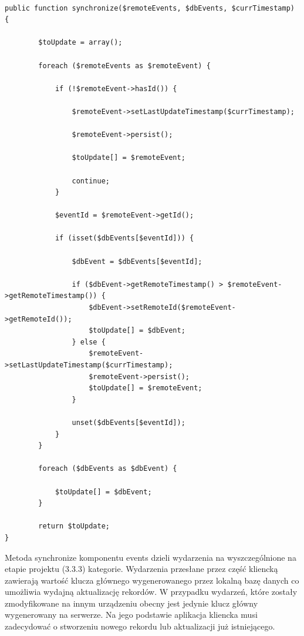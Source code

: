 \begin{lstlisting}[caption=Modyfikacja wydarzeń w metodzie synchronize komponentu Events., label=amb, captionpos=b]

public function synchronize($remoteEvents, $dbEvents, $currTimestamp) {

    	$toUpdate = array();

    	foreach ($remoteEvents as $remoteEvent) {

	        if (!$remoteEvent->hasId()) {

            	$remoteEvent->setLastUpdateTimestamp($currTimestamp);

            	$remoteEvent->persist();

            	$toUpdate[] = $remoteEvent;

            	continue;
        	}

        	$eventId = $remoteEvent->getId();

        	if (isset($dbEvents[$eventId])) {

            	$dbEvent = $dbEvents[$eventId];

            	if ($dbEvent->getRemoteTimestamp() > $remoteEvent->getRemoteTimestamp()) {
                	$dbEvent->setRemoteId($remoteEvent->getRemoteId());
                	$toUpdate[] = $dbEvent;
            	} else {
                	$remoteEvent->setLastUpdateTimestamp($currTimestamp);
                	$remoteEvent->persist();
                	$toUpdate[] = $remoteEvent;
            	}

            	unset($dbEvents[$eventId]);
        	}
    	}

    	foreach ($dbEvents as $dbEvent) {

        	$toUpdate[] = $dbEvent;
    	}

    	return $toUpdate;
}

\end{lstlisting}

Metoda synchronize komponentu events dzieli wydarzenia na wyszczególnione na etapie projektu (3.3.3) kategorie. Wydarzenia przesłane przez część kliencką zawierają wartość klucza głównego wygenerowanego przez lokalną bazę danych co umożliwia wydajną aktualizację rekordów. W przypadku wydarzeń, które zostały zmodyfikowane na innym urządzeniu obecny jest jedynie klucz główny wygenerowany na serwerze. Na jego podstawie aplikacja kliencka musi zadecydować o stworzeniu nowego rekordu lub aktualizacji już istniejącego.